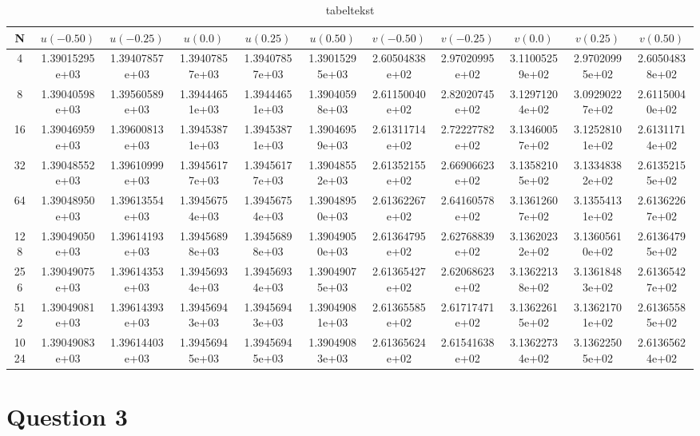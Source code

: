 \begin{table}[th!]
\centering
\begin{tabular}{c|c|c|c|c|c|c|c|c|c|c}
 N &  \( u(-0.50) \) & \( u(-0.25) \) & \( u(0.0) \) & \( u(0.25) \) & \( u(0.50) \) & \( v(-0.50) \) & \( v(-0.25) \) & \( v(0.0) \) & \( v(0.25) \) & \( v(0.50) \)  \\\hline
4&1.39015295e+03&1.39407857e+03&1.39407857e+03&1.39407857e+03&1.39015295e+03&2.60504838e+02&2.97020995e+02&3.11005259e+02&2.97020995e+02&2.60504838e+02\\
8&1.39040598e+03&1.39560589e+03&1.39444651e+03&1.39444651e+03&1.39040598e+03&2.61150040e+02&2.82020745e+02&3.12971204e+02&3.09290227e+02&2.61150040e+02
\\
16&1.39046959e+03&1.39600813e+03&1.39453871e+03&1.39453871e+03&1.39046959e+03&2.61311714e+02&2.72227782e+02&3.13460057e+02&3.12528101e+02&2.61311714e+02\\
32&1.39048552e+03&1.39610999e+03&1.39456177e+03&1.39456177e+03&1.39048552e+03&2.61352155e+02&2.66906623e+02&3.13582105e+02&3.13348382e+02&2.61352155e+02\\
64&1.39048950e+03&1.39613554e+03&1.39456754e+03&1.39456754e+03&1.39048950e+03&2.61362267e+02&2.64160578e+02&3.13612607e+02&3.13554131e+02&2.61362267e+02
 \\
128&1.39049050e+03&1.39614193e+03&1.39456898e+03&1.39456898e+03&1.39049050e+03&2.61364795e+02&2.62768839e+02&3.13620232e+02&3.13605610e+02&2.61364795e+02 \\ 
256&1.39049075e+03&1.39614353e+03&1.39456934e+03&1.39456934e+03&1.39049075e+03&2.61365427e+02&2.62068623e+02&3.13622138e+02&3.13618483e+02&2.61365427e+02\\
512&1.39049081e+03&1.39614393e+03&1.39456943e+03&1.39456943e+03&1.39049081e+03&2.61365585e+02&2.61717471e+02&3.13622615e+02&3.13621701e+02&2.61365585e+02 \\
1024&1.39049083e+03&1.39614403e+03&1.39456945e+03&1.39456945e+03&1.39049083e+03&2.61365624e+02&2.61541638e+02&3.13622734e+02&3.13622505e+02&2.61365624e+02 \\
\end{tabular}
\caption[tekst i indholdsfortegnelsen]{tabeltekst}
\label{tb:resultater}
\end{table}



\newpage
\section*{Question 3}

